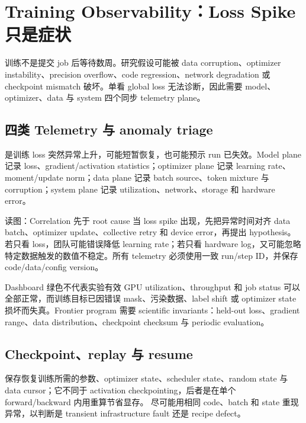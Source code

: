 \section{Training Observability：Loss Spike 只是症状}

训练不是提交 job 后等待数周。研究假设可能被 data corruption、optimizer instability、precision overflow、code regression、network degradation 或 checkpoint mismatch 破坏。单看 global loss 无法诊断，因此需要 model、optimizer、data 与 system 四个同步 telemetry plane。

\subsection{四类 Telemetry 与 anomaly triage}

 是训练 loss 突然异常上升，可能短暂恢复，也可能预示 run 已失效。Model plane 记录 loss、gradient/activation statistics；optimizer plane 记录 learning rate、moment/update norm；data plane 记录 batch source、token mixture 与 corruption；system plane 记录 utilization、network、storage 和 hardware error。


\begin{knowledgebox}{读图：Correlation 先于 root cause}
当 loss spike 出现，先把异常时间对齐 data batch、optimizer update、collective retry 和 device error，再提出 hypothesis。若只看 loss，团队可能错误降低 learning rate；若只看 hardware log，又可能忽略特定数据触发的数值不稳定。所有 telemetry 必须使用一致 run/step ID，并保存 code/data/config version。
\end{knowledgebox}

\begin{warningbox}{Dashboard 绿色不代表实验有效}
GPU utilization、throughput 和 job status 可以全部正常，而训练目标已因错误 mask、污染数据、label shift 或 optimizer state 损坏而失真。Frontier program 需要 scientific invariants：held-out loss、gradient range、data distribution、checkpoint checksum 与 periodic evaluation。
\end{warningbox}

\subsection{Checkpoint、replay 与 resume}

 保存恢复训练所需的参数、optimizer state、scheduler state、random state 与 data cursor；它不同于 activation checkpointing，后者是在单个 forward/backward 内用重算节省显存。 尽可能用相同 code、batch 和 state 重现异常，以判断是 transient infrastructure fault 还是 recipe defect。

